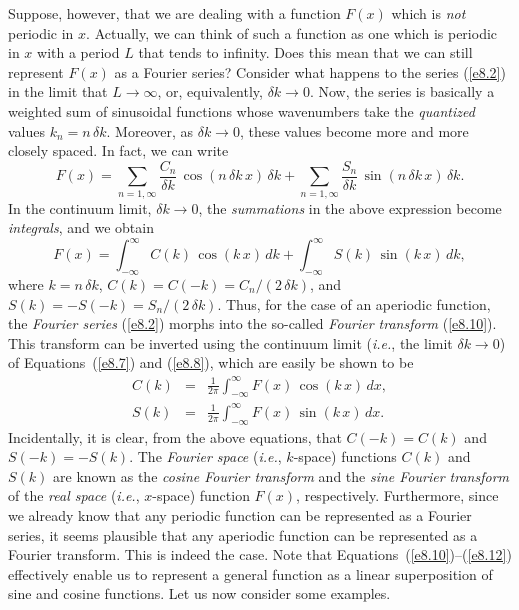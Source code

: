 Suppose, however, that we are dealing with a function $F(x)$ which is {\em not}\/ periodic in $x$. 
Actually, we can think of such a function as one which is periodic in $x$ with a period $L$ that
tends to infinity. Does this mean that we can still represent $F(x)$ as a Fourier series?
Consider what happens to the series (\ref{e8.2}) in the limit that $L\rightarrow\infty$, or, equivalently, $\delta k\rightarrow 0$. Now, the series is basically a weighted sum of sinusoidal functions
whose wavenumbers take the {\em quantized}\/ values $k_n=n\,\delta k$.  Moreover, as
$\delta k\rightarrow 0$, these values become more and more closely
spaced. In fact, we can write
\begin{equation}
F(x) = \sum_{n=1,\infty} \frac{C_n}{\delta k}\,\cos(n\,\delta k\,x)\,\delta k+ \sum_{n=1,\infty} \frac{S_n}{\delta k} \,\sin(n\,\delta k\,x)\,\delta k.
\end{equation}
In the continuum limit, $\delta k\rightarrow 0$, the {\em summations}\/ in the above expression become {\em integrals}, and
we obtain
\begin{equation}\label{e8.10}
F(x)=\int_{-\infty}^\infty C(k)\,\cos(k\,x)\,dk + \int_{-\infty}^\infty S(k)\,\sin(k\,x)\,dk,
\end{equation}
where $k=n\,\delta k$, $C(k)=C(-k)= C_n/(2\,\delta k)$, and $S(k)=-S(-k)=S_n/(2\,\delta k)$. 
Thus, for the case of an aperiodic function, the {\em Fourier series}\/ (\ref{e8.2}) morphs into the so-called {\em Fourier transform}\/ (\ref{e8.10}). This transform can be inverted using the continuum limit ({\em i.e.}, the  limit $\delta k\rightarrow 0$) of Equations~(\ref{e8.7}) and (\ref{e8.8}), which are easily be shown to be
\begin{eqnarray}\label{e8.11}
C(k) &=& \frac{1}{2\pi}\int_{-\infty}^\infty F(x)\,\cos(k\,x)\,dx,\\[0.5ex]
S(k) &=&\frac{1}{2\pi}\int_{-\infty}^\infty F(x)\,\sin(k\,x)\,dx.\label{e8.12}
\end{eqnarray}
Incidentally, it is clear, from the above equations, that $C(-k)=C(k)$ and $S(-k)=-S(k)$. 
The {\em Fourier space}\/ ({\em i.e.}, $k$-space) functions $C(k)$ and $S(k)$ are known as the {\em cosine Fourier transform}\/ and
the {\em sine Fourier transform}\/ of the {\em real space}\/ ({\em i.e.}, $x$-space) function $F(x)$, respectively. 
Furthermore, since we already know that any periodic function can be represented as a Fourier series, it seems
plausible that any aperiodic function can be represented as a Fourier transform. This is indeed the case. Note that Equations~(\ref{e8.10})--(\ref{e8.12}) effectively enable us to  represent a general function as a linear superposition of sine and cosine functions. 
Let us now consider some examples. 


